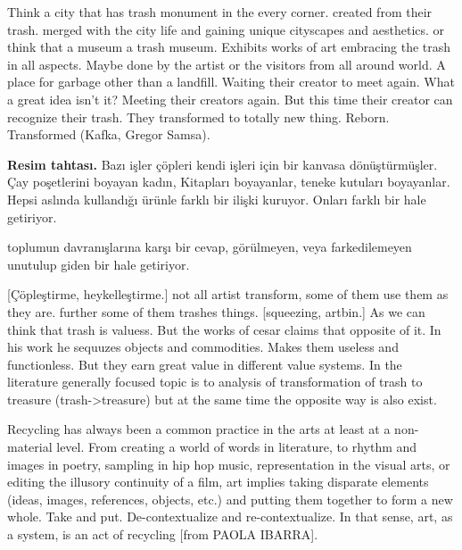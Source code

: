 Think a city that has trash monument in the every corner. created from their trash. merged with the city life and gaining unique cityscapes and aesthetics. or think that a museum a trash museum. Exhibits works of art embracing the trash in all aspects. Maybe done by the artist or the visitors from all around world. A place for garbage other than a landfill. Waiting their creator to meet again. What a great idea isn't it? Meeting their creators again. But this time their creator can recognize their trash. They transformed to totally new thing. Reborn. Transformed (Kafka, Gregor Samsa).



\textbf{Resim tahtası.} Bazı işler çöpleri kendi işleri için bir kanvasa dönüştürmüşler. Çay poşetlerini boyayan kadın, Kitapları boyayanlar, teneke kutuları boyayanlar. Hepsi aslında kullandığı ürünle farklı bir ilişki kuruyor. Onları farklı bir hale getiriyor.  

toplumun davranışlarına karşı bir cevap, görülmeyen, veya farkedilemeyen unutulup giden bir hale getiriyor.

[Çöpleştirme, heykelleştirme.] not all artist transform, some of them use them as they are. further some of them trashes things. [squeezing, artbin.] As we can think that trash is valuess. But the works of cesar claims that opposite of it. In his work he sequuzes objects and commodities. Makes them useless and functionless. But they earn great value in different value systems. In the literature generally focused topic is to analysis of transformation of trash to treasure (trash->treasure) but at the same time the opposite way is also exist.

Recycling has always been a common practice in the arts at least at a non-material level. From creating a world of words in literature, to rhythm and images in poetry, sampling in hip hop music, representation in the visual arts, or editing the illusory continuity of a film, art implies taking disparate elements (ideas, images, references, objects, etc.) and putting them together to form a new whole. Take and put. De-contextualize and re-contextualize. In that sense, art, as a system, is an act of recycling [from PAOLA IBARRA]. 

